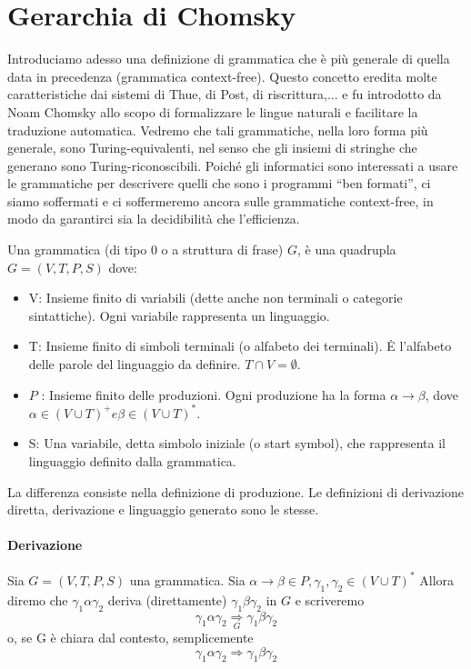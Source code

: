 \chapter{Gerarchia di Chomsky}
Introduciamo adesso una deﬁnizione di grammatica che è più generale di quella data in precedenza (grammatica context-free).
Questo concetto eredita molte caratteristiche dai sistemi di Thue, di Post, di riscrittura,... e fu introdotto da Noam Chomsky allo scopo di formalizzare le lingue naturali e facilitare la traduzione automatica.
Vedremo che tali grammatiche, nella loro forma più generale, sono Turing-equivalenti, nel senso che gli insiemi di stringhe che generano sono Turing-riconoscibili.
Poiché gli informatici sono interessati a usare le grammatiche per descrivere quelli che sono i programmi “ben formati”, ci siamo soﬀermati e ci soffermeremo ancora sulle grammatiche context-free, in modo da garantirci sia la decidibilità che l’efficienza.

\vspace{5mm}

Una grammatica (di tipo 0 o a struttura di frase) $G$, è una quadrupla $G=(V, T, P, S)$ dove:
\begin{itemize}
    \item V: Insieme finito di variabili (dette anche non terminali o categorie sintattiche). Ogni variabile rappresenta un linguaggio.
    \item T: Insieme finito di simboli terminali (o alfabeto dei terminali). Ė l'alfabeto delle parole del linguaggio da definire. $T \cap V=\emptyset$.
    \item $P$ : Insieme finito delle produzioni. Ogni produzione ha la forma $\alpha \rightarrow \beta$, dove $\alpha \in(V \cup T)^{+} e \beta \in(V \cup T)^{*}$.
    \item S: Una variabile, detta simbolo iniziale (o start symbol), che rappresenta il linguaggio definito dalla grammatica.
\end{itemize}

La diﬀerenza consiste nella deﬁnizione di produzione.
Le deﬁnizioni di derivazione diretta, derivazione e linguaggio generato sono le stesse.

\subsubsection{Derivazione}
Sia $G=(V, T, P, S)$ una grammatica.
Sia $\alpha \rightarrow \beta \in P, \gamma_{1}, \gamma_{2} \in(V \cup T)^{*}$
Allora diremo che
$\gamma_{1} \alpha \gamma_{2}$ deriva (direttamente) $\gamma_{1} \beta \gamma_{2}$ in $G$ e scriveremo
$$
\gamma_{1} \alpha \gamma_{2} \underset{G}{\Rightarrow} \gamma_{1} \beta \gamma_{2}
$$
o, se G è chiara dal contesto, semplicemente
$$
\gamma_{1} \alpha \gamma_{2} \Rightarrow \gamma_{1} \beta \gamma_{2}
$$

